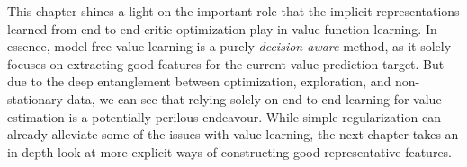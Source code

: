This chapter shines a light on the important role that the implicit representations learned from end-to-end critic optimization play in value function learning.
In essence, model-free value learning is a purely \emph{decision-aware} method, as it solely focuses on extracting good features for the current value prediction target.
But due to the deep entanglement between optimization, exploration, and non-stationary data, we can see that relying solely on end-to-end learning for value estimation is a potentially perilous endeavour.
While simple regularization can already alleviate some of the issues with value learning,  the next chapter takes an in-depth look at more explicit ways of constructing good representative features.
